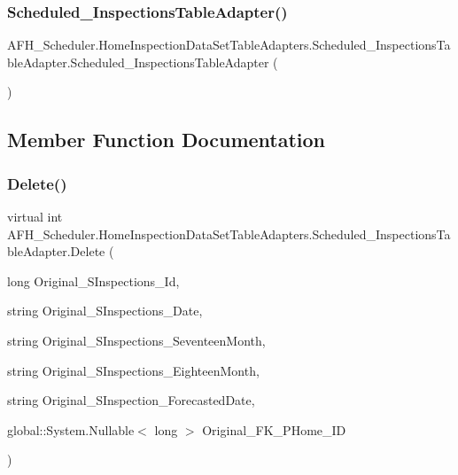 \subsubsection{Scheduled\_InspectionsTableAdapter()}
{\footnotesize\ttfamily A\+F\+H\+\_\+\+Scheduler.\+Home\+Inspection\+Data\+Set\+Table\+Adapters.\+Scheduled\+\_\+\+Inspections\+Table\+Adapter.\+Scheduled\+\_\+\+Inspections\+Table\+Adapter (\begin{DoxyParamCaption}{ }\end{DoxyParamCaption})}



\subsection{Member Function Documentation}
\mbox{\label{class_a_f_h___scheduler_1_1_home_inspection_data_set_table_adapters_1_1_scheduled___inspections_table_adapter_ac3a863e072bc20fee5b43ddde3c93c38}} 
\subsubsection{Delete()}
{\footnotesize\ttfamily virtual int A\+F\+H\+\_\+\+Scheduler.\+Home\+Inspection\+Data\+Set\+Table\+Adapters.\+Scheduled\+\_\+\+Inspections\+Table\+Adapter.\+Delete (\begin{DoxyParamCaption}\item[{long}]{Original\+\_\+\+S\+Inspections\+\_\+\+Id,  }\item[{string}]{Original\+\_\+\+S\+Inspections\+\_\+\+Date,  }\item[{string}]{Original\+\_\+\+S\+Inspections\+\_\+\+Seventeen\+Month,  }\item[{string}]{Original\+\_\+\+S\+Inspections\+\_\+\+Eighteen\+Month,  }\item[{string}]{Original\+\_\+\+S\+Inspection\+\_\+\+Forecasted\+Date,  }\item[{global\+::\+System.\+Nullable$<$ long $>$}]{Original\+\_\+\+F\+K\+\_\+\+P\+Home\+\_\+\+ID }\end{DoxyParamCaption})\hspace{0.3cm}{\ttfamily [virtual]}}

